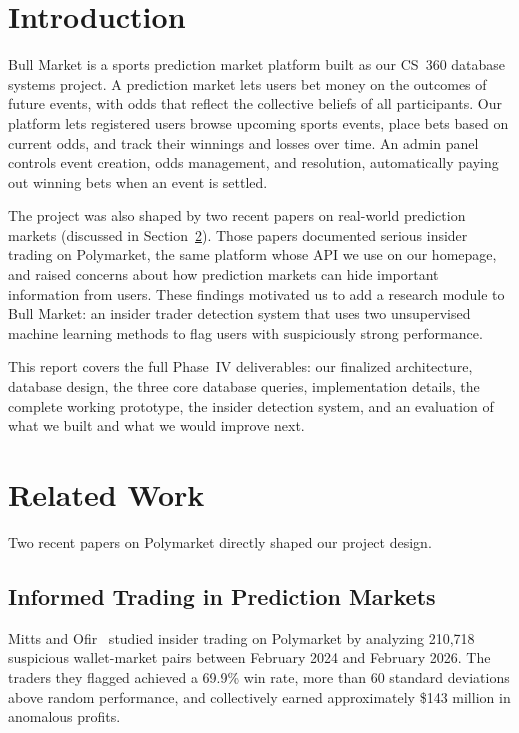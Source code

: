 \documentclass[sigconf,nonacm]{acmart}
\begin{document}
\section{Introduction}

Bull Market is a sports prediction market platform built as our
CS~360 database systems project. A prediction market lets users bet
money on the outcomes of future events, with odds that reflect the
collective beliefs of all participants. Our platform lets registered
users browse upcoming sports events, place bets based on current odds,
and track their winnings and losses over time. An admin panel controls
event creation, odds management, and resolution, automatically paying
out winning bets when an event is settled.

The project was also shaped by two recent papers on real-world
prediction markets (discussed in Section~\ref{sec:relatedwork}). Those
papers documented serious insider trading on Polymarket, the same
platform whose API we use on our homepage, and raised concerns about
how prediction markets can hide important information from users. These
findings motivated us to add a research module to Bull Market: an
insider trader detection system that uses two unsupervised machine
learning methods to flag users with suspiciously strong performance.

This report covers the full Phase~IV deliverables: our finalized
architecture, database design, the three core database queries,
implementation details, the complete working prototype, the insider
detection system, and an evaluation of what we built and what we would
improve next.

\section{Related Work}
\label{sec:relatedwork}

Two recent papers on Polymarket directly shaped our project design.

\subsection{Informed Trading in Prediction Markets}

Mitts and Ofir~\cite{mitts2025iran} studied insider trading on
Polymarket by analyzing 210,718 suspicious wallet-market pairs between
February 2024 and February 2026. The traders they flagged achieved a
69.9\% win rate, more than 60 standard deviations above random
performance, and collectively earned approximately \$143 million in
anomalous profits.
\end{document}
